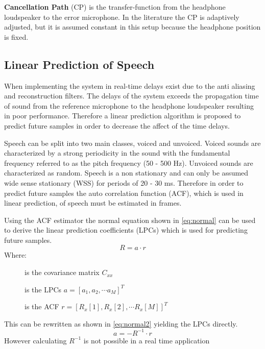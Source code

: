 \textbf{Cancellation Path} (CP) is the transfer-function from the headphone loudspeaker to the error microphone. In the literature \cite{Hansen} the CP is adaptively adjusted, but it is assumed constant in this setup because the headphone position is fixed.     

\subsection*{Linear Prediction of Speech}
When implementing the system in real-time delays exist due to the anti aliasing and reconstruction filters. The delays of the system exceeds the propagation time of sound from the reference microphone to the headphone loudspeaker resulting in poor performance. Therefore a linear prediction algorithm is proposed to predict future samples in order to decrease the affect of the time delays.


Speech can be split into two main classes, voiced and unvoiced. Voiced sounds are characterized by a strong periodicity in the sound with the fundamental frequency referred to as the pitch frequency (50 - 500 Hz). Unvoiced sounds are characterized as random. Speech is a non stationary and can only be assumed wide sense stationary (WSS) for periods of 20 - 30 ms. Therefore in order to predict future samples the auto correlation function (ACF), which is used in linear prediction, of speech must be estimated in frames. 


Using the ACF estimator the normal equation shown in \autoref{eq:normal} can be used to derive the linear prediction coefficients (LPCs) which is used for predicting future samples. 
\begin{equation}\label{eq:normal}
R = a\cdot r
\end{equation}
Where:
\vspace{-8mm} %
\begin{description}
	\item[] is the covariance matrix $C_{xx}$
	\item[] is the LPCs $a = [a_1 , a_2, \cdots a_M]^T$
	\item[] is the ACF $r = [R_x[1] , R_x[2], \cdots R_x[M]]^T$
\end{description}
This can be rewritten as shown in \autoref{eq:normal2} yielding the LPCs directly.  
 \begin{equation}\label{eq:normal2}
a = -R^{-1}\cdot r
\end{equation}
However calculating $R^{-1}$ is not possible in a real time application 




